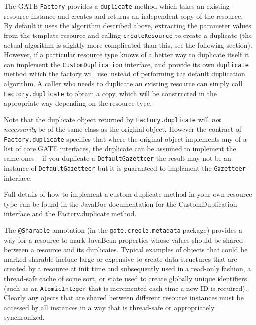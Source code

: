 The GATE {\tt Factory} provides a {\tt duplicate} method which takes an
existing resource instance and creates and returns an independent copy of the
resource.  By default it uses the algorithm described above, extracting the
parameter values from the template resource and calling {\tt createResource} to
create a duplicate (the actual algorithm is slightly more complicated than
this, see the following section).  However, if a particular resource type
knows of a better way to duplicate itself it can implement the
{\tt CustomDuplication} interface, and provide its own {\tt duplicate} method
which the factory will use instead of performing the default duplication
algorithm.  A caller who needs to duplicate an existing resource can simply
call {\tt Factory.duplicate} to obtain a copy, which will be constructed in the
appropriate way depending on the resource type.

Note that the duplicate object returned by {\tt Factory.duplicate} will
\emph{not necessarily} be of the same class as the original object.  However
the contract of {\tt Factory.duplicate} specifies that where the original
object implements any of a list of core GATE interfaces, the duplicate can be
assumed to implement the same ones -- if you duplicate a {\tt DefaultGazetteer}
the result may not be an instance of {\tt DefaultGazetteer} but it is
guaranteed to implement the {\tt Gazetteer} interface.

Full details of how to implement a custom duplicate method in your own resource
type can be found in the JavaDoc documentation for the
%
{CustomDuplication interface} and the
%
{Factory.duplicate} method.


The \verb|@Sharable| annotation (in the \verb|gate.creole.metadata| package)
provides a way for a resource to mark JavaBean properties whose values should
be shared between a resource and its duplicates.  Typical examples of objects
that could be marked sharable include large or expensive-to-create data
structures that are created by a resource at init time and subsequently used in
a read-only fashion, a thread-safe cache of some sort, or state used to
create globally unique identifiers (such as an \verb|AtomicInteger| that is
incremented each time a new ID is required).  Clearly any ojects that are
shared between different resource instances must be accessed by all instances
in a way that is thread-safe or appropriately synchronized.

